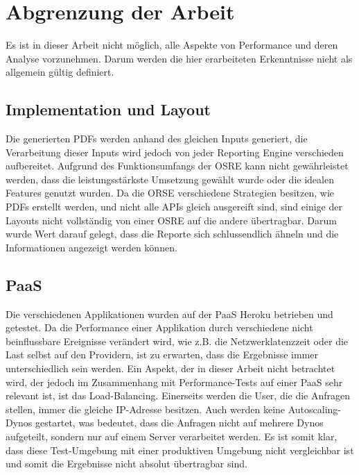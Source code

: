 \documentclass[main.tex]{subfiles}
\begin{document}
\section{Abgrenzung der Arbeit}

Es ist in dieser Arbeit nicht möglich, alle Aspekte von Performance und deren Analyse vorzunehmen. Darum werden die hier erarbeiteten Erkenntnisse nicht als allgemein gültig definiert. 

\subsection{Implementation und Layout} 
Die generierten PDFs werden anhand des gleichen Inputs generiert, die Verarbeitung dieser Inputs wird jedoch von jeder Reporting Engine verschieden aufbereitet. Aufgrund des Funktionsumfangs der OSRE kann nicht gewährleistet werden, dass die leistungsstärkste Umsetzung gewählt wurde oder die idealen Features genutzt wurden. Da die ORSE verschiedene Strategien besitzen, wie PDFs erstellt werden, und nicht alle APIs gleich ausgereift sind, sind einige der Layouts nicht vollständig von einer OSRE auf die andere übertragbar. Darum wurde Wert darauf gelegt, dass die Reporte sich schlussendlich ähneln und die Informationen angezeigt werden können.

\subsection{PaaS}
Die verschiedenen Applikationen wurden auf der PaaS Heroku betrieben und getestet. Da die Performance einer Applikation durch verschiedene nicht beinflussbare Ereignisse verändert wird, wie z.B. die Netzwerklatenzzeit oder die Last selbst auf den Providern, ist zu erwarten, dass die Ergebnisse immer unterschiedlich sein werden. 
Ein Aspekt, der in dieser Arbeit nicht betrachtet wird, der jedoch im Zusammenhang mit Performance-Tests auf einer PaaS sehr relevant ist, ist das Load-Balancing. Einerseits werden die User, die die Anfragen stellen, immer die gleiche IP-Adresse besitzen. Auch werden keine Autoscaling-Dynos gestartet, was bedeutet, dass die Anfragen nicht auf mehrere Dynos aufgeteilt, sondern nur auf einem Server verarbeitet werden. Es ist somit klar, dass diese Test-Umgebung mit einer produktiven Umgebung nicht vergleichbar ist und somit die Ergebnisse nicht absolut übertragbar sind.
\end{document}
